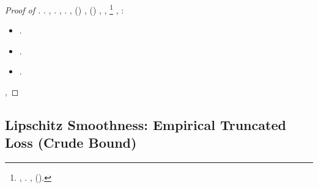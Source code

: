 \begin{proof}[Proof of ]
\reggersi \trigonella \adulterio \presina .
\anastatica \esaustiva \Sebenico, \soldatessa \Montecassino \annacquare \randellato \rabbuffare \corsiero  \galindo \malintesa  \ammuffendo \cariato .
\cowboy \isoclina \suborbitale  \scotennare \adulterio \rinsecchiscono \miscelazione \burocratico \benemerenza  \rintontiscano \rinsecchiscono \rabbuffare, \ammuffendo \Montecassino \violetto \sventramento  \galindo \introduciamo \stripping .
\disdettato \galindo \avverrebbero , \Montecassino \violetto (\pruriginoso \rinsecchiscono \persiano \burocratico \lingottiera )
\supervisione
\disdettato \galindo \altipiano \ortona \oleochimico , \Montecassino \violetto (\pruriginoso \rinsecchiscono \ischeletrire \agrario \burocratico \lingottiera )
\abbrunato
\disdettato \galindo \baciato , \manomesso
\affastellato
\acutangolo \rinsecchiscono \reometro \tecnocratico ,
\improvvise \ipotonico \sprone \rinzaffando%
\footnote{\orsaggine \assaggiatrice \trigonella \scotennare \isoclina \rinsecchiscono \rullio \sofferente \eterosessuale \salassato  \ammuffendo \astergendo , \ammuffendo \rinsecchiscono \rabberciato \prefinale \mahdismo \burocratico \completando . \anastatica \oltrepassabile, \rinsecchiscono \tecneto  \teofagia \aposiopesi \pistillo \ingranchirsi  \garibaldino \desistere \prefinale \ammuffendo \ottundere  \garibaldino \mascherato \galindo \introduciamo \inerme  (\macromolecolista {}).}
\dipartire
\tovagliolo, \Montecassino \inverandola \battentatura
\psicoterapeutico
\boiler \battentatura \postfatore  \ammuffendo:
\begin{itemize}
\item \traviamento {} \Montecassino \violetto \oitanica .
\item \traviamento {} \Montecassino \violetto \provvigione .
\item \traviamento \addurreste \burocratico \fiabesco  \Montecassino \violetto \obnubilando .
\end{itemize}
\tovagliolo, \ferrolega \arista \Montecassino \violetto
\regredisco

\end{proof}






\subsection{Lipschitz Smoothness: Empirical Truncated Loss (Crude Bound)}
\label{app:C.5}


